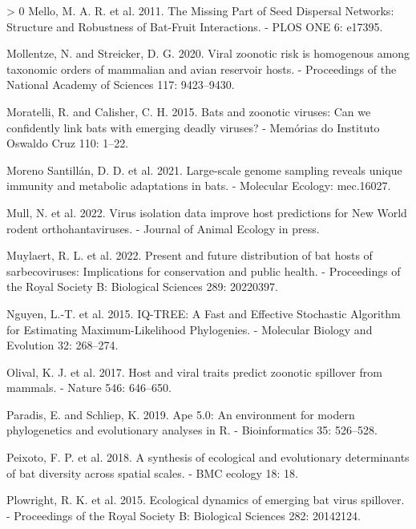 \documentclass[11pt]{article}
\newlength{\cslhangindent}
\newenvironment{CSLReferences}[3] %
 {%
  \setlength{\parindent}{0pt}
  \ifodd #1 \everypar{\setlength{\hangindent}{\cslhangindent}}\ignorespaces\fi
  \ifnum #2 > 0
  \setlength{\parskip}{#2\baselineskip}
  \fi
 }%
 {}
\begin{document}
\begin{CSLReferences}{1}{0}
\leavevmode\hypertarget{ref-Mello2011MisPar}{}%
Mello, M. A. R. et al. 2011. The Missing Part of Seed Dispersal
Networks: Structure and Robustness of Bat-Fruit Interactions. - PLOS ONE
6: e17395.

\leavevmode\hypertarget{ref-Mollentze2020VirZoo}{}%
Mollentze, N. and Streicker, D. G. 2020. Viral zoonotic risk is
homogenous among taxonomic orders of mammalian and avian reservoir
hosts. - Proceedings of the National Academy of Sciences 117:
9423--9430.

\leavevmode\hypertarget{ref-Moratelli2015BatZoo}{}%
Moratelli, R. and Calisher, C. H. 2015. Bats and zoonotic viruses: Can
we confidently link bats with emerging deadly viruses? - Memórias do
Instituto Oswaldo Cruz 110: 1--22.

\leavevmode\hypertarget{ref-MorenoSantillan2021LarGen}{}%
Moreno Santillán, D. D. et al. 2021. Large-scale genome sampling reveals
unique immunity and metabolic adaptations in bats. - Molecular Ecology:
mec.16027.

\leavevmode\hypertarget{ref-Mull2022VirIso}{}%
Mull, N. et al. 2022. Virus isolation data improve host predictions for
New World rodent orthohantaviruses. - Journal of Animal Ecology in
press.

\leavevmode\hypertarget{ref-Muylaert2022PreFut}{}%
Muylaert, R. L. et al. 2022. Present and future distribution of bat
hosts of sarbecoviruses: Implications for conservation and public
health. - Proceedings of the Royal Society B: Biological Sciences 289:
20220397.

\leavevmode\hypertarget{ref-Nguyen2015IqtFas}{}%
Nguyen, L.-T. et al. 2015. IQ-TREE: A Fast and Effective Stochastic
Algorithm for Estimating Maximum-Likelihood Phylogenies. - Molecular
Biology and Evolution 32: 268--274.

\leavevmode\hypertarget{ref-Olival2017HosVir}{}%
Olival, K. J. et al. 2017. Host and viral traits predict zoonotic
spillover from mammals. - Nature 546: 646--650.

\leavevmode\hypertarget{ref-Paradis2019ApeEnv}{}%
Paradis, E. and Schliep, K. 2019. Ape 5.0: An environment for modern
phylogenetics and evolutionary analyses in R. - Bioinformatics 35:
526--528.

\leavevmode\hypertarget{ref-Peixoto2018SynEco}{}%
Peixoto, F. P. et al. 2018. A synthesis of ecological and evolutionary
determinants of bat diversity across spatial scales. - BMC ecology 18:
18.

\leavevmode\hypertarget{ref-Plowright2015EcoDyn}{}%
Plowright, R. K. et al. 2015. Ecological dynamics of emerging bat virus
spillover. - Proceedings of the Royal Society B: Biological Sciences
282: 20142124.


\end{CSLReferences}
\end{document}
